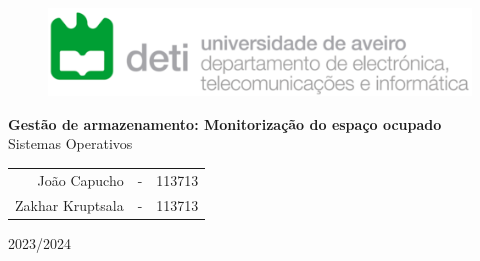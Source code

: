 \thispagestyle{empty}

\begin{figure}[H]
	\centering
	\includegraphics[width=12cm]{figs/deti.png}
\end{figure}

\vspace{4cm}

\begin{center}
	\onehalfspacing\textbf{\huge
		Gestão de armazenamento:
		Monitorização do espaço ocupado
	}\\
	\vspace{1cm}
	{\LARGE Sistemas Operativos}

	\vspace{2cm}

	\large
	\begin{tabular}{ r c c }
		João Capucho     & - & 113713 \\
		Zakhar Kruptsala & - & 113713
	\end{tabular}
	\vfill
	{\Large 2023/2024}
\end{center}
